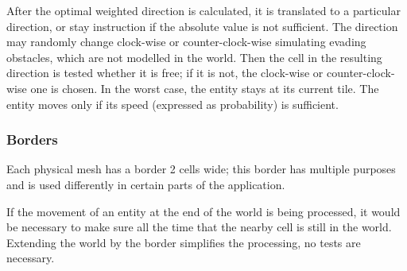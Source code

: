 \documentclass[a4paper]{article}
\begin{document}

After the optimal weighted direction is calculated, it is translated to a particular direction, or stay instruction if the absolute value is not sufficient.
The direction may randomly change clock-wise or counter-clock-wise simulating evading obstacles, which are not modelled in the world.
Then the cell in the resulting direction is tested whether it is free; if it is not, the clock-wise or counter-clock-wise one is chosen.
In the worst case, the entity stays at its current tile.
The entity moves only if its speed (expressed as probability) is sufficient.

\subsubsection{Borders}

Each physical mesh has a border 2 cells wide; this border has multiple purposes and is used differently in certain parts of the application.

If the movement of an entity at the end of the world is being processed, it would be necessary to make sure all the time that the nearby cell is still in the world.
Extending the world by the border simplifies the processing, no tests are necessary.
\end{document}
